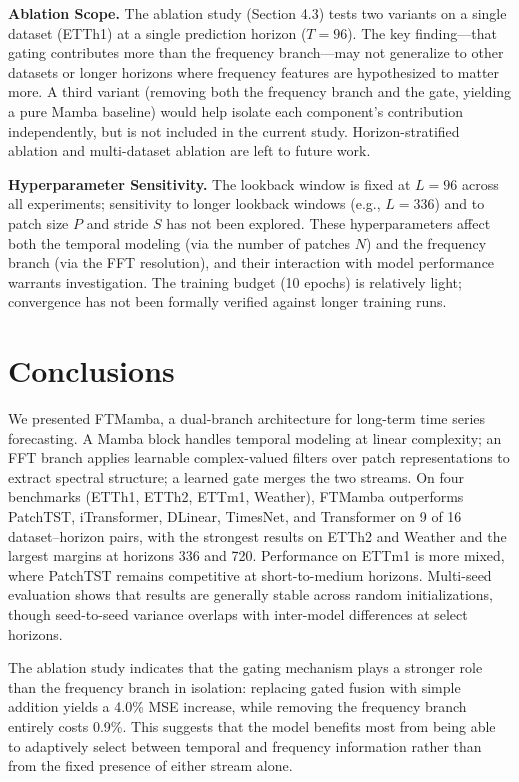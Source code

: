 \documentclass[electronics,article,submit,pdftex,moreauthors]{Definitions/mdpi}
\begin{document}
\textbf{Ablation Scope.} The ablation study (Section 4.3) tests two variants on a single dataset (ETTh1) at a single prediction horizon ($T=96$). The key finding---that gating contributes more than the frequency branch---may not generalize to other datasets or longer horizons where frequency features are hypothesized to matter more. A third variant (removing both the frequency branch and the gate, yielding a pure Mamba baseline) would help isolate each component's contribution independently, but is not included in the current study. Horizon-stratified ablation and multi-dataset ablation are left to future work.

\textbf{Hyperparameter Sensitivity.} The lookback window is fixed at $L=96$ across all experiments; sensitivity to longer lookback windows (e.g., $L=336$) and to patch size $P$ and stride $S$ has not been explored. These hyperparameters affect both the temporal modeling (via the number of patches $N$) and the frequency branch (via the FFT resolution), and their interaction with model performance warrants investigation. The training budget (10 epochs) is relatively light; convergence has not been formally verified against longer training runs.

\section{Conclusions}

We presented FTMamba, a dual-branch architecture for long-term time series forecasting. A Mamba block handles temporal modeling at linear complexity; an FFT branch applies learnable complex-valued filters over patch representations to extract spectral structure; a learned gate merges the two streams. On four benchmarks (ETTh1, ETTh2, ETTm1, Weather), FTMamba outperforms PatchTST, iTransformer, DLinear, TimesNet, and Transformer on 9 of 16 dataset--horizon pairs, with the strongest results on ETTh2 and Weather and the largest margins at horizons 336 and 720. Performance on ETTm1 is more mixed, where PatchTST remains competitive at short-to-medium horizons. Multi-seed evaluation shows that results are generally stable across random initializations, though seed-to-seed variance overlaps with inter-model differences at select horizons.

The ablation study indicates that the gating mechanism plays a stronger role than the frequency branch in isolation: replacing gated fusion with simple addition yields a 4.0\% MSE increase, while removing the frequency branch entirely costs 0.9\%. This suggests that the model benefits most from being able to adaptively select between temporal and frequency information rather than from the fixed presence of either stream alone.
\end{document}
